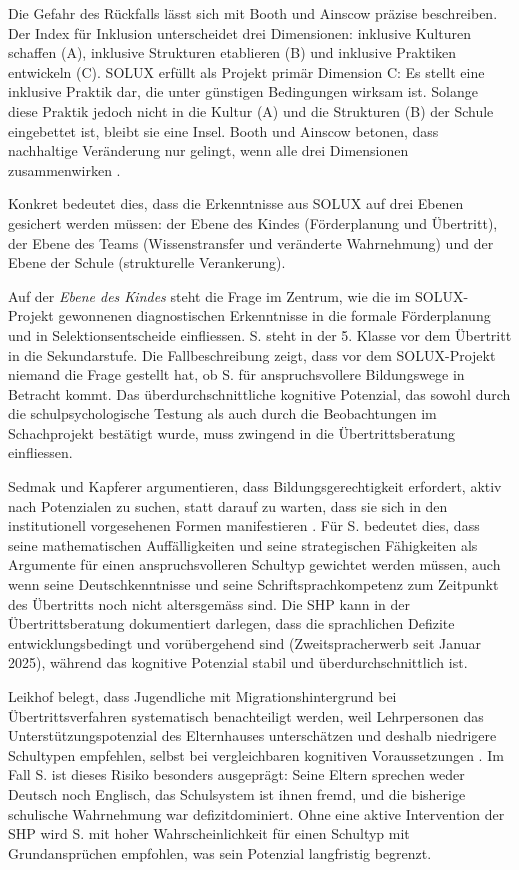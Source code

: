 \documentclass[ngerman, a4paper]{article}
\begin{document}
Die Gefahr des Rückfalls lässt sich mit Booth und Ainscow präzise beschreiben.
Der Index für Inklusion unterscheidet drei Dimensionen: inklusive Kulturen schaffen
(A), inklusive Strukturen etablieren (B) und inklusive Praktiken entwickeln (C).
SOLUX erfüllt als Projekt primär Dimension C: Es stellt eine inklusive Praktik
dar, die unter günstigen Bedingungen wirksam ist. Solange diese Praktik jedoch
nicht in die Kultur (A) und die Strukturen (B) der Schule eingebettet ist, bleibt
sie eine Insel. Booth und Ainscow betonen, dass nachhaltige Veränderung nur gelingt,
wenn alle drei Dimensionen zusammenwirken \parencite{booth2019index}.

Konkret bedeutet dies, dass die Erkenntnisse aus SOLUX auf drei Ebenen gesichert
werden müssen: der Ebene des Kindes (Förderplanung und Übertritt), der Ebene des
Teams (Wissenstransfer und veränderte Wahrnehmung) und der Ebene der Schule
(strukturelle Verankerung).

Auf der \textit{Ebene des Kindes} steht die Frage im Zentrum, wie die im
SOLUX-Projekt gewonnenen diagnostischen Erkenntnisse in die formale
Förderplanung und in Selektionsentscheide einfliessen. S. steht in der
5. Klasse vor dem Übertritt in die Sekundarstufe. Die Fallbeschreibung zeigt,
dass vor dem SOLUX-Projekt niemand die Frage gestellt hat, ob S. für
anspruchsvollere Bildungswege in Betracht kommt. Das überdurchschnittliche
kognitive Potenzial, das sowohl durch die schulpsychologische Testung als
auch durch die Beobachtungen im Schachprojekt bestätigt wurde, muss zwingend
in die Übertrittsberatung einfliessen.

Sedmak und Kapferer argumentieren, dass Bildungsgerechtigkeit erfordert, aktiv
nach Potenzialen zu suchen, statt darauf zu warten, dass sie sich in den
institutionell vorgesehenen Formen manifestieren
\parencite{sedmak2021bildungsgerechtigkeit}. Für S. bedeutet dies, dass seine
mathematischen Auffälligkeiten und seine strategischen Fähigkeiten als
Argumente für einen anspruchsvolleren Schultyp gewichtet werden müssen, auch
wenn seine Deutschkenntnisse und seine Schriftsprachkompetenz zum Zeitpunkt
des Übertritts noch nicht altersgemäss sind. Die SHP kann in der
Übertrittsberatung dokumentiert darlegen, dass die sprachlichen Defizite
entwicklungsbedingt und vorübergehend sind (Zweitspracherwerb seit Januar 2025),
während das kognitive Potenzial stabil und überdurchschnittlich ist.

Leikhof belegt, dass Jugendliche mit Migrationshintergrund bei
Übertrittsverfahren systematisch benachteiligt werden, weil Lehrpersonen
das Unterstützungspotenzial des Elternhauses unterschätzen und deshalb
niedrigere Schultypen empfehlen, selbst bei vergleichbaren kognitiven
Voraussetzungen \parencite{leikhof2021jugendliche}. Im Fall S. ist dieses
Risiko besonders ausgeprägt: Seine Eltern sprechen weder Deutsch noch Englisch,
das Schulsystem ist ihnen fremd, und die bisherige schulische Wahrnehmung
war defizitdominiert. Ohne eine aktive Intervention der SHP wird S. mit hoher
Wahrscheinlichkeit für einen Schultyp mit Grundansprüchen empfohlen, was
sein Potenzial langfristig begrenzt.
\end{document}
